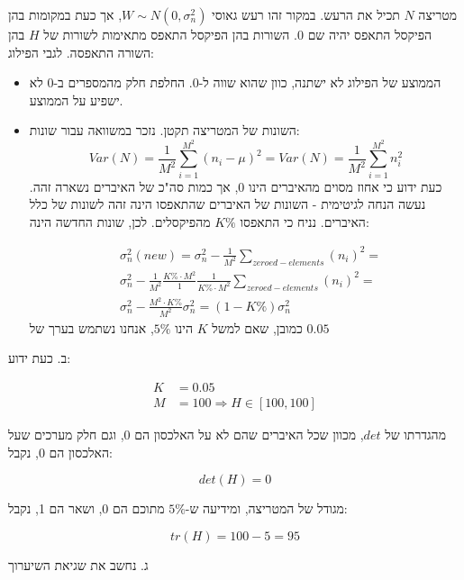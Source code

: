 \documentclass[a4paper]{iacas}
\begin{document}
\begin{hebrew}
מטריצה $N$ תכיל את הרעש. במקור זהו רעש גאוסי $W \sim N(0,\sigma_n^2)$, אך כעת במקומות בהן הפיקסל התאפס יהיה שם 0. השורות בהן הפיקסל התאפס מתאימות לשורות של $H$ בהן השורה התאפסה. לגבי הפילוג:
\begin{itemize}
\item הממוצע של הפילוג לא ישתנה, כוון שהוא שווה ל-$0$. החלפת חלק מהמספרים ב-$0$ לא ישפיע על הממוצע.
\item השונות של המטריצה תקטן. נזכר במשוואה עבור שונות:
\begin{equation*}
Var(N) = \frac{1}{M^2}\sum_{i=1}^{M^2}{(n_i - \mu)^2} = Var(N) = \frac{1}{M^2}\sum_{i=1}^{M^2}{n_i^2} 
\end{equation*}
כעת ידוע כי אחוז מסוים מהאיברים הינו $0$, אך כמות סה"כ של האיברים נשארה זהה. נעשה הנחה לגיטימית - השונות של האיברים שהתאפסו הינה זהה לשונות של כלל האיברים. נניח כי התאפסו $K\%$ מהפיקסלים. לכן, שונות החדשה הינה:

\begin{equation*}
\begin{aligned}
&\sigma_n^2 (new) = \sigma_n^2 -  \frac{1}{M^2}\sum_{zeroed-elements}{(n_i)^2} =\\
&\sigma_n^2 -  \frac{1}{M^2}\frac{K\%\cdot M^2}{1}\frac{1}{K\%\cdot M^2}\sum_{zeroed-elements}{(n_i)^2} =\\
&\sigma_n^2 - \frac{M^2 \cdot K\%}{M^2}\sigma_n^2 = (1-K\%)\sigma^2_n
\end{aligned}
\end{equation*}
כמובן, שאם למשל $K$ הינו $5\%$,  אנחנו נשתמש בערך של $0.05$
\end{itemize}
\end{hebrew}



\begin{hebrew}

ב. כעת ידוע:
\end{hebrew}



\begin{align*}
K &= 0.05 \\ 
M &= 100   \Longrightarrow  H \in [100,100]
\end{align*}

\begin{hebrew}

מהגדרתו של $det$, מכוון שכל האיברים שהם לא על האלכסון הם 0, וגם חלק מערכים שעל האלכסון הם 0, נקבל:
\end{hebrew}

\begin{equation*}
det(H) = 0
\end{equation*}

\begin{hebrew}

מגודל של המטריצה, ומידיעה ש-$5\%$ מתוכם הם 0, ושאר הם 1, נקבל:
\end{hebrew}
\begin{equation*}
tr(H) = 100 - 5 = 95
\end{equation*}

\begin{hebrew}

ג. נחשב את שגיאת השיערוך
\end{hebrew}
\end{document}
